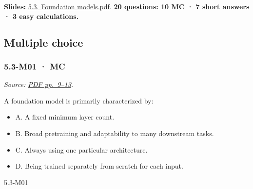 \textbf{Slides:}
\href{../Lecture\%20Slides/5.3.\%20Foundation\%20models.pdf}{5.3.
Foundation models.pdf}. \textbf{20 questions: 10 MC · 7 short answers ·
3 easy calculations.}

\subsection{Multiple choice}\label{multiple-choice-15}

\noindent\begin{minipage}{\linewidth}

\subsubsection{5.3-M01 · MC}\label{m01-mc-14}

\emph{Source:
\href{../Lecture\%20Slides/5.3.\%20Foundation\%20models.pdf\#page=9}{PDF
pp.~9--13}.}

A foundation model is primarily characterized by:

\begin{itemize}
\tightlist
\item
  A. A fixed minimum layer count.
\item
  B. Broad pretraining and adaptability to many downstream tasks.
\item
  C. Always using one particular architecture.
\item
  D. Being trained separately from scratch for each input.
\end{itemize}

\begin{solution}[8mm]{5.3-M01}

\end{solution}
\end{minipage}\par\medskip

